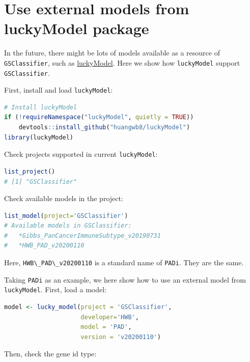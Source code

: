 \documentclass[
  12pt,
]{book}
\newcommand{\passthrough}[1]{#1}
\begin{document}
\hypertarget{use-external-models-from-luckymodel-package}{%
\section{Use external models from luckyModel package}\label{use-external-models-from-luckymodel-package}}

In the future, there might be lots of models available as a resource of \passthrough{\lstinline!GSClassifier!}, such as \href{https://github.com/huangwb8/luckyModel}{luckyModel}. Here we show how \passthrough{\lstinline!luckyModel!} support \passthrough{\lstinline!GSClassifier!}.

First, install and load \passthrough{\lstinline!luckyModel!}:

\begin{lstlisting}[language=R]
# Install luckyModel
if (!requireNamespace("luckyModel", quietly = TRUE))
    devtools::install_github("huangwb8/luckyModel")
library(luckyModel)
\end{lstlisting}

Check projects supported in current \passthrough{\lstinline!luckyModel!}:

\begin{lstlisting}[language=R]
list_project()
# [1] "GSClassifier"
\end{lstlisting}

Check available models in the project:

\begin{lstlisting}[language=R]
list_model(project='GSClassifier')
# Available models in GSClassifier:
#   *Gibbs_PanCancerImmuneSubtype_v20190731
#   *HWB_PAD_v20200110
\end{lstlisting}

Here, \passthrough{\lstinline!HWB\_PAD\_v20200110!} is a standard name of \passthrough{\lstinline!PADi!}. They are the same.

Taking \passthrough{\lstinline!PADi!} as an example, we here show how to use an external model from \passthrough{\lstinline!luckyModel!}. First, load a model:

\begin{lstlisting}[language=R]
model <- lucky_model(project = 'GSClassifier',
                     developer='HWB',
                     model = 'PAD',
                     version = 'v20200110')
\end{lstlisting}

Then, check the gene id type:
\end{document}
